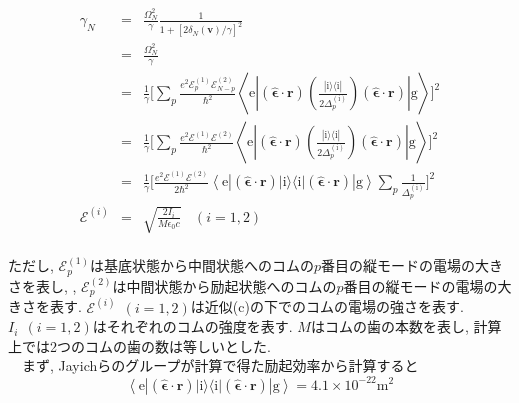 \documentclass[uplatex, dvipdfmx, a4paper, report, papersize, 11pt]{jsbook}
\begin{document}
\begin{eqnarray}\label{approx_ex-rate}
  \gamma_N &=& \frac{\Omega^2_N}{\gamma}\frac{1}{1 + [2\delta_N(\bm{v})/\gamma]^2} \nonumber\\
  &=& \frac{\Omega^2_N}{\gamma}  \nonumber\\
  &=& \frac{1}{\gamma} \Biggl[ \sum _ { p } \frac { e ^ { 2 } \mathcal { E } ^{(1)}_ { p } \mathcal { E }^{(2)} _ { N - p } } { \hbar ^ { 2 } } \left\langle \mathrm { e } \left| ( \hat { \boldsymbol { \epsilon } } \cdot \mathbf { r } ) \left(  \frac { | \mathrm { i } \rangle \langle \mathrm { i } | } { 2 \Delta _ { p } ^ { ( \mathrm { i } ) } } \right) ( \hat { \boldsymbol { \epsilon } } \cdot \mathbf { r } ) \right| \mathrm { g } \right\rangle \Biggr]^2 \nonumber \\
  &=& \frac{1}{\gamma} \Biggl[ \sum _ { p } \frac { e ^ { 2 } \mathcal { E }^{(1)} \mathcal { E } ^ {(2)} } { \hbar ^ { 2 } } \left\langle \mathrm { e } \left| ( \hat { \boldsymbol { \epsilon } } \cdot \mathbf { r } ) \left(  \frac { | \mathrm { i } \rangle \langle \mathrm { i } | } { 2 \Delta _ { p } ^ { ( \mathrm { i } ) } } \right) ( \hat { \boldsymbol { \epsilon } } \cdot \mathbf { r } ) \right| \mathrm { g } \right\rangle \Biggr]^2 \nonumber \\
  &=& \frac{1}{  \gamma   }\Biggl[ \frac{e^2  \mathcal { E } ^ {(1)} \mathcal { E } ^ {(2)}}{2\hbar ^ {2}}\left\langle \mathrm { e } \left| ( \hat { \boldsymbol { \epsilon } } \cdot \mathbf { r } ) | \mathrm { i } \rangle \langle \mathrm { i } |  ( \hat { \boldsymbol { \epsilon } } \cdot \mathbf { r } ) \right| \mathrm { g } \right\rangle\sum _ { p }\frac{1}{ \Delta _ { p } ^ { ( \mathrm { i } ) }} \Biggr]^2\\
  \mathcal{E}^{(i)} &=&  \sqrt{\frac{2 I_{i}}{M \epsilon_0 c}}\ \ \ \ (i = 1,2)
\end{eqnarray}\\
ただし, $\mathcal{E}^{(1)}_p$は基底状態から中間状態へのコムの$p$番目の縦モードの電場の大きさを表し, , $\mathcal{E}^{(2)}_p$は中間状態から励起状態へのコムの$p$番目の縦モードの電場の大きさを表す. $\mathcal{E}^{(i)}\ \ (i = 1,2)$は近似(c)の下でのコムの電場の強さを表す. $I_{i}\ \ (i = 1,2)$はそれぞれのコムの強度を表す. $M$はコムの歯の本数を表し, 計算上では2つのコムの歯の数は等しいとした. \\
　まず, Jayichらのグループが計算で得た励起効率から計算すると
\begin{equation}
\left\langle \mathrm { e } \left| ( \hat { \boldsymbol { \epsilon } } \cdot \mathbf { r } ) | \mathrm { i } \rangle \langle \mathrm { i } |  ( \hat { \boldsymbol { \epsilon } } \cdot \mathbf { r } ) \right| \mathrm { g } \right\rangle = 4.1 \times 10^{-22}　\mathrm{m^2}
\end{equation}
\end{document}
